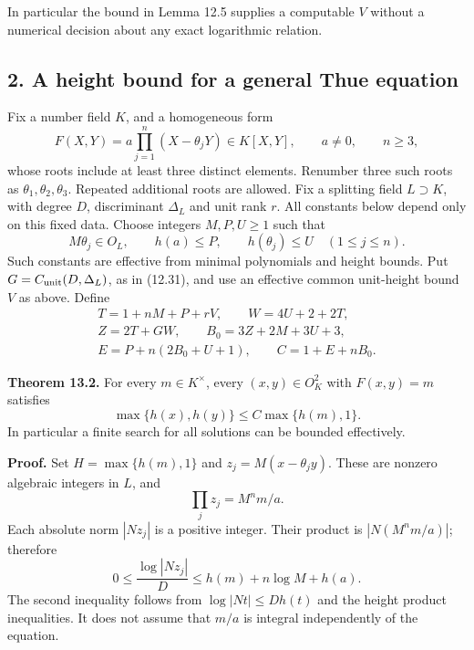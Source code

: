 \documentclass[
  11pt,
  a4paper,
]{article}
\begin{document}
In particular the bound in Lemma 12.5 supplies a computable \(V\)
without a numerical decision about any exact logarithmic relation.

\subsection{2. A height bound for a general Thue
equation}\label{a-height-bound-for-a-general-thue-equation}

Fix a number field \(K\), and a homogeneous form \[
F(X,Y)=a\prod_{j=1}^n(X-\theta_jY)\in K[X,Y],
\qquad a\ne0,\qquad n\ge3,
\tag{13.4}
\] whose roots include at least three distinct elements. Renumber three
such roots as \(\theta_1,\theta_2,\theta_3\). Repeated additional roots
are allowed. Fix a splitting field \(L\supset K\), with degree \(D\),
discriminant \(\Delta_L\) and unit rank \(r\). All constants below
depend only on this fixed data. Choose integers \(M,P,U\ge1\) such that
\[
M\theta_j\in O_L,\qquad h(a)\le P,\qquad h(\theta_j)\le U
\quad(1\le j\le n).
\tag{13.5}
\] Such constants are effective from minimal polynomials and height
bounds. Put \(G=C_{\rm unit}(D,\Delta_L)\), as in (12.31), and use an
effective common unit-height bound \(V\) as above. Define \[
\begin{gathered}
T=1+nM+P+rV,\qquad W=4U+2+2T,\\
Z=2T+GW,\qquad B_0=3Z+2M+3U+3,\\
E=P+n(2B_0+U+1),\qquad C=1+E+nB_0.
\end{gathered}
\tag{13.6}
\]

\textbf{Theorem 13.2.} For every \(m\in K^\times\), every
\((x,y)\in O_K^2\) with \(F(x,y)=m\) satisfies \[
\max\{h(x),h(y)\}\le C\max\{h(m),1\}.
\tag{13.7}
\] In particular a finite search for all solutions can be bounded
effectively.

\textbf{Proof.} Set \(H=\max\{h(m),1\}\) and \(z_j=M(x-\theta_jy)\).
These are nonzero algebraic integers in \(L\), and \[
\prod_jz_j=M^nm/a.
\tag{13.8}
\] Each absolute norm \(|N z_j|\) is a positive integer. Their product
is \(|N(M^nm/a)|\); therefore \[
0\le\frac{\log|Nz_j|}{D}
\le h(m)+n\log M+h(a).
\tag{13.9}
\] The second inequality follows from \(\log|Nt|\le D h(t)\) and the
height product inequalities. It does not assume that \(m/a\) is integral
independently of the equation.
\end{document}
